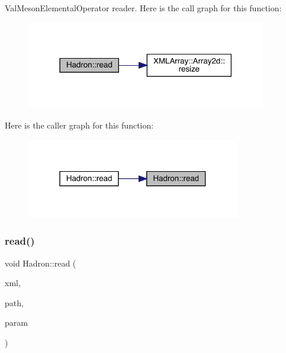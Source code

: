Val\+Meson\+Elemental\+Operator reader. Here is the call graph for this function\+:
\nopagebreak
\begin{figure}[H]
\begin{center}
\leavevmode
\includegraphics[width=297pt]{d1/daf/namespaceHadron_ae34c01603f5e8f9246374fddfaa8e062_cgraph}
\end{center}
\end{figure}
Here is the caller graph for this function\+:
\nopagebreak
\begin{figure}[H]
\begin{center}
\leavevmode
\includegraphics[width=265pt]{d1/daf/namespaceHadron_ae34c01603f5e8f9246374fddfaa8e062_icgraph}
\end{center}
\end{figure}
\mbox{\label{namespaceHadron_adc5eb75838fc176e1641d6264c9a894d}} 
\subsubsection{\texorpdfstring{read()}{read()}\hspace{0.1cm}{\footnotesize\ttfamily [59/94]}}
{\footnotesize\ttfamily void Hadron\+::read (\begin{DoxyParamCaption}\item[{\mbox{\hyperlink{classADATXML_1_1XMLReader}{X\+M\+L\+Reader}} \&}]{xml,  }\item[{const std\+::string \&}]{path,  }\item[{\mbox{\hyperlink{structHadron_1_1KeyHadronSUNNPartIrrepOp__t_1_1CGPair__t}{Key\+Hadron\+S\+U\+N\+N\+Part\+Irrep\+Op\+\_\+t\+::\+C\+G\+Pair\+\_\+t}} \&}]{param }\end{DoxyParamCaption})}


